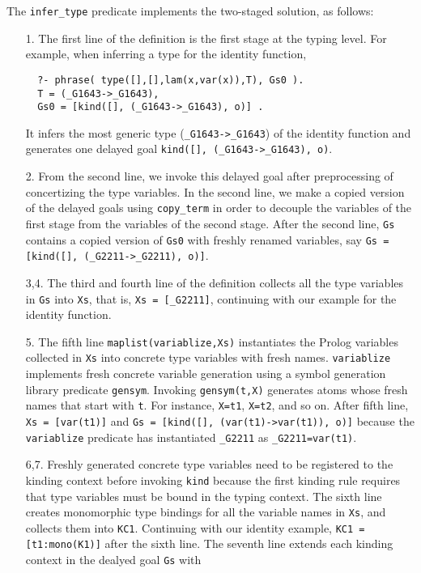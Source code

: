 \documentclass[runningheads,a4paper]{llncs}
\begin{document}
The \verb|infer_type| predicate implements the two-staged solution,
as follows:
\begin{itemize}
\item[1.]
The first line of the definition is the first stage at the typing level.
For example, when inferring a type for the identity function,
\begin{verbatim}
  ?- phrase( type([],[],lam(x,var(x)),T), Gs0 ).
  T = (_G1643->_G1643),
  Gs0 = [kind([], (_G1643->_G1643), o)] .
\end{verbatim}
It infers the most generic type (\verb|_G1643->_G1643|)
of the identity function and generates one delayed goal
\verb|kind([], (_G1643->_G1643), o)|.
\item[2.] From the second line,
we invoke this delayed goal after preprocessing of concertizing
the type variables. In the second line, we make a copied version of
the delayed goals using \verb|copy_term| in order to decouple
the variables of the first stage from the variables of the second stage.
After the second line, \verb|Gs| contains a copied version of \verb|Gs0|
with freshly renamed variables, say
\verb|Gs = [kind([], (_G2211->_G2211), o)]|.
\item[3,4.]
The third and fourth line of the definition collects all the type variables
in \verb|Gs| into \verb|Xs|, that is, \verb|Xs = [_G2211]|, continuing with
our example for the identity function.
\item[5.]
The fifth line \verb|maplist(variablize,Xs)| instantiates
the Prolog variables collected in \verb|Xs| into
concrete type variables with fresh names. \verb|variablize|
implements fresh concrete variable generation using
a symbol generation library predicate \verb|gensym|.
Invoking \verb|gensym(t,X)| generates atoms whose fresh names that
start with \verb|t|. For instance, \verb|X=t1|, \verb|X=t2|, and so on.
After fifth line, \verb|Xs = [var(t1)]| and
\verb|Gs = [kind([], (var(t1)->var(t1)), o)]| because 
the \verb|variablize| predicate has instantiated \verb|_G2211|
as \verb|_G2211=var(t1)|.
\item[6,7.] Freshly generated concrete type variables need to be
registered to the kinding context before invoking \verb|kind|
because the first kinding rule requires that type variables must be
bound in the typing context. The sixth line creates monomorphic
type bindings for all the variable names in \verb|Xs|, and collects
them into \verb|KC1|. Continuing with our identity example,
\verb|KC1 = [t1:mono(K1)]| after the sixth line. The seventh line
extends each kinding context in the dealyed goal \verb|Gs| with

\end{itemize}
\end{document}
